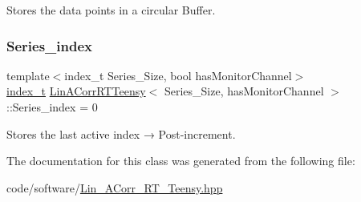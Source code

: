 Stores the data points in a circular Buffer. 

\mbox{\label{classLinACorrRTTeensy_abe0523ada55375281deacb143b6055b7}} 
\subsubsection{\texorpdfstring{Series\+\_\+index}{Series\_index}}
{\footnotesize\ttfamily template$<$index\+\_\+t Series\+\_\+\+Size, bool has\+Monitor\+Channel$>$ \\
\hyperlink{types_8hpp_ab41b824af8e088d090c0b9e60f536c9d}{index\+\_\+t} \hyperlink{classLinACorrRTTeensy}{Lin\+A\+Corr\+R\+T\+Teensy}$<$ Series\+\_\+\+Size, has\+Monitor\+Channel $>$\+::Series\+\_\+index = 0}



Stores the last active index → Post-\/increment. 



The documentation for this class was generated from the following file\+:\begin{DoxyCompactItemize}
\item 
code/software/\hyperlink{Lin__ACorr__RT__Teensy_8hpp}{Lin\+\_\+\+A\+Corr\+\_\+\+R\+T\+\_\+\+Teensy.\+hpp}\end{DoxyCompactItemize}

